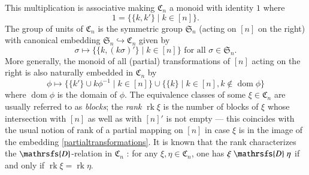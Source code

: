 \documentclass[preprint,1p,times]{elsarticle}
\DeclareMathOperator{\dom}{dom} \DeclareMathOperator{\ran}{ran}
\DeclareMathOperator{\rk}{rk} \DeclareMathOperator{\tr}{tr}
\numberwithin{equation}{section}
\theoremstyle{remark}
\def\Dc{\mathrsfs{D}}
\def\si{\sigma}
\def\C{\mathfrak{C}}
\def\Sim{\mathfrak{S}}
\begin{document}
This multiplication is associative making $\C_n$ a monoid with identity $1$ where
$$1=\{\{k,k'\}\mid k\in [n]\}.$$
The group of units of $\C_n$ is the symmetric group $\Sim_n$ (acting on $[n]$ on the right) with canonical embedding
$\Sim_n\hookrightarrow \C_n$ given by
$$\sigma\mapsto \{\{k,(k\si)'\}\mid k\in [n]\} \text{ for all } \si\in
\Sim_n.$$ More generally, the monoid of all (partial) transformations of $[n]$ acting on the right is also naturally
embedded in $\C_n$ by
\begin{equation}
\label{partialtransformations} \phi\mapsto \{\{k'\}\cup k\phi^{-1}\mid k\in [n]\}\cup\{\{k\}\mid k\in [n],k\notin\dom
\phi\}
\end{equation}
where $\dom \phi$ is the domain of $\phi$. The equivalence classes of some $\xi\in \C_n$ are usually referred to as
\emph{blocks}; the \emph{rank} $\rk\xi$ is the number of blocks of $\xi$ whose intersection with $[n]$ as well as with
$[n]'$ is not empty --- this coincides with the usual notion of rank of a partial mapping on $[n]$ in case $\xi$ is in
the image of the embedding \eqref{partialtransformations}. It is  known that the rank characterizes the $\Dc$-relation
in $\C_n$ \cite{Maz1,KM2}: for any $\xi,\eta\in\C_n$, one has $\xi\mathrel{\Dc}\eta$ if and only if $\rk\xi=\rk\eta$.
\end{document}

